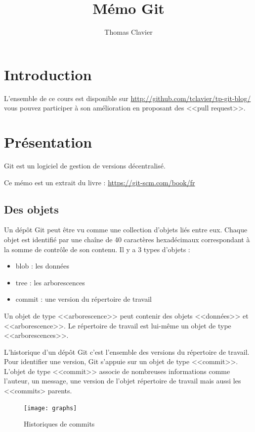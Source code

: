 \documentclass[a4paper]{article}
\title{Mémo Git}
\author{Thomas Clavier}
\date{}
\begin{document}
\maketitle

\section*{Introduction}

L'ensemble de ce cours est disponible sur \url{http://github.com/tclavier/tp-git-blog/} vous pouvez participer à son amélioration en proposant des <<pull request>>.

\section*{Présentation}

Git est un logiciel de gestion de versions décentralisé.

Ce mémo est un extrait du livre : \url{https://git-scm.com/book/fr}

\subsection*{Des objets}
Un dépôt Git peut être vu comme une collection d’objets liés entre eux. 
Chaque objet est identifié par une chaîne de 40 caractères hexadécimaux
correspondant à la somme de contrôle de son contenu. 
Il y a 3 types d'objets : 
\begin{itemize}
\item blob : les données
\item tree : les arborescences
\item commit : une version du répertoire de travail
\end{itemize}
Un objet de type <<arborescence>> peut contenir des objets <<données>> et <<arborescence>>.
Le répertoire de travail est lui-même un objet de type <<arborescences>>. 

L'historique d'un dépôt Git c'est l'ensemble des versions du répertoire de travail. Pour identifier une version, Git s'appuie sur un objet de type <<commit>>. 
L'objet de type <<commit>> associe de nombreuses informations comme l'auteur, un message, une version de l'objet répertoire de travail mais aussi les <<commits> parents.

\begin{figure}[h]
  \center
  \texttt{[image: graphs]}
  \caption{Historiques de commits}
\end{figure}
\end{document}
